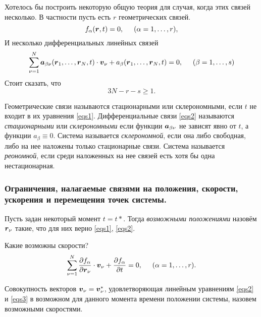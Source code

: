Хотелось бы построить некоторую общую теория для случая, когда этих связей несколько. 
В частности пусть есть $r$ геометрических связей.
\begin{equation}
\label{eqs1}
    f_\alpha (\mbox{\boldmath $r$}, t) = 0, \hspace{0.5cm} (\alpha = 1, \ldots, r),
\end{equation}
И несколько дифференциальных линейных связей
\begin{equation}
\label{eqs2}
    \sum_{\nu=1}^N \mbox{\boldmath $a$}_{\beta \nu} (\mbox{\boldmath $r$}_1, \ldots, \mbox{\boldmath $r$}_N, t) \cdot \mbox{\boldmath $v$}_\nu + a_\beta  (\mbox{\boldmath $r$}_1, \ldots, \mbox{\boldmath $r$}_N, t) = 0,
    \hspace{0.5cm} (\beta = 1, \ldots, s)
\end{equation}
Стоит сказать, что
$$
    3N - r - s \geq 1.
$$

\begin{to_def} 
     Геометрические связи называются стационарными или склерономными, если $t$ не входит в их уравнения \eqref{eqs1}. Дифференциальные связи \eqref{eqs2} называются \textit{стационарными} или \textit{склерономными} если функции $\mbox{\boldmath $a$}_{\beta\nu}$ не зависят явно от $t$, а функции $a_\beta \equiv 0$. Система называется \textit{склерономной}, если она либо свободная, либо на нее наложены только стационарные связи. Система называется \textit{реономной}, если среди наложенных на нее связей есть хотя бы одна нестационарная.
\end{to_def}


\subsubsection*{Ограничения, налагаемые связями на положения, скорости, ускорения и перемещения точек системы.}

Пусть задан некоторый момент $t = t*$. Тогда \textit{возможными положениями} назовём $\mbox{\boldmath $r$}_\nu$ такие, что для них верно \eqref{eqs1}, \eqref{eqs2}. 

Какие возможны скорости?
\begin{equation}
    \label{eqs3}
    \sum_{\nu=1}^N \frac{\partial f_\alpha}{\partial \mbox{\boldmath $r$}_\nu} \cdot \mbox{\boldmath $v$}_\nu +   \frac{\partial f_\alpha}{\partial t} = 0, \hspace{0.5cm} (\alpha = 1, \ldots, r).
\end{equation}

Совокупность векторов $\mbox{\boldmath $v$}_\nu = \mbox{\boldmath $v$}_\nu^*$, удовлетворяющая линейным
уравнениям \eqref{eqs2} и \eqref{eqs3} в возможном для данного момента времени положении
системы, назовем возможными скоростями. 

